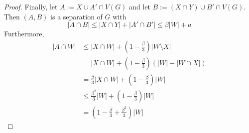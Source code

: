\documentclass{patmorin}
\begin{document}
\begin{proof}
  Finally, let $A:=X\cup A'\cap V(G)$ and let $B:=(X\cap Y)\cup B'\cap V(G)$.  Then $(A,B)$ is a separation of $G$ with
  \[
    |A\cap B|\le |X\cap Y|+|A'\cap B'| \le \beta|W| + a
  \]
  Furthermore,
  \begin{align*}
    |A\cap W| & \le |X\cap W|+(1-\tfrac{\beta}{3})|W\setminus X| \\
       & = |X\cap W|+(1-\tfrac{\beta}{3})(|W|-|W\cap X|) \\
       & = \tfrac{\beta}{3}|X\cap W|+(1-\tfrac{\beta}{3})|W| \\
       & \le \tfrac{\beta^2}{3}|W|+(1-\tfrac{\beta}{3})|W| \\
       & = (1-\tfrac{\beta}{3}+\tfrac{\beta^2}{3})|W|
  \end{align*}
\end{proof}





\end{document}
